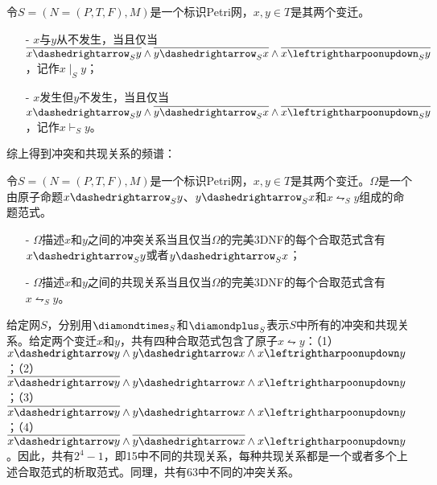 \begin{definition}[不发生]
令$S=(N=(P,T,F),M)$是一个标识Petri网，$x,y\in T$是其两个变迁。
  \begin{itemize}
    \item[-] $x$与$y$从不发生，当且仅当$\overline{x\dashedrightarrow_{S}y}\wedge\overline{y\dashedrightarrow_{S}x}\wedge\overline{x\leftrightharpoonupdown_{S}y}$，记作$x\mid_{S}y$；
    \item[-] $x$发生但$y$不发生，当且仅当$x\dashedrightarrow_{S}y\wedge\overline{y\dashedrightarrow_{S}x}\wedge\overline{x\leftrightharpoonupdown_{S}y}$，记作$x\vdash_{S}y$。
  \end{itemize}
\end{definition}
综上得到冲突和共现关系的频谱：
\begin{definition}[冲突和共现关系的频谱]\label{def:spectrum_of_conflict_cooccurence}
令$S=(N=(P,T,F),M)$是一个标识Petri网，$x,y\in T$是其两个变迁。$\Omega$是一个由原子命题$x\dashedrightarrow_{S}y$、$y\dashedrightarrow_{S}x$和$x\leftrightharpoonupdown_{S}y$组成的命题范式。
  \begin{itemize}
    \item[-] $\Omega$描述$x$和$y$之间的冲突关系当且仅当$\Omega$的完美3DNF的每个合取范式含有$x\dashedrightarrow_{S}y$或者$y\dashedrightarrow_{S}x$；
    \item[-] $\Omega$描述$x$和$y$之间的共现关系当且仅当$\Omega$的完美3DNF的每个合取范式含有$x\leftrightharpoonupdown_{S}y$。
  \end{itemize}
\end{definition}
给定网$S$，分别用$\diamondtimes_{S}$和$\diamondplus_{S}$表示$S$中所有的冲突和共现关系。给定两个变迁$x$和$y$，共有四种合取范式包含了原子$x\leftrightharpoonupdown y$：（1）$x\dashedrightarrow y\wedge y\dashedrightarrow x\wedge x\leftrightharpoonupdown y$；（2）$\overline{x\dashedrightarrow y}\wedge y\dashedrightarrow x\wedge x\leftrightharpoonupdown y$；（3）$\overline{x\dashedrightarrow y}\wedge y\dashedrightarrow x\wedge x\leftrightharpoonupdown y$；（4）$\overline{x\dashedrightarrow y}\wedge\overline{y\dashedrightarrow x}\wedge x\leftrightharpoonupdown y$。因此，共有$2^{4}-1$，即15中不同的共现关系，每种共现关系都是一个或者多个上述合取范式的析取范式。同理，共有63中不同的冲突关系。

